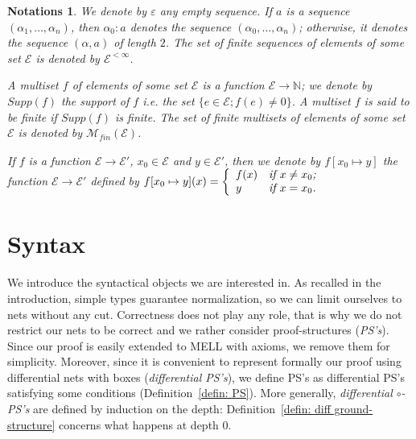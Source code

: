 \documentclass{article}
\theoremstyle{plain}
\newtheorem*{notations}{Notations}
\newcommand{\Nat}{\ensuremath{\mathbb{N}}}
\newcommand{\finitemultisets}[1]{\mathcal{M}_\textit{fin}(#1)}
\newcommand{\finitesequences}[1]{{#1}^{< \infty}}
\newcommand{\emptysequence}{\varepsilon}
\newcommand{\supp}[1]{\textit{Supp}(#1)}
\begin{document}
\begin{notations} 
We denote by $\emptysequence$ any empty sequence. If $a$ is a sequence $(\alpha_1, \ldots, \alpha_n)$, then $\alpha_0:a$ denotes the sequence $(\alpha_0, \ldots, \alpha_n)$; otherwise, it denotes the sequence $(\alpha, a)$ of length $2$. The set of finite sequences of elements of some set $\mathcal{E}$ is denoted by $\finitesequences{\mathcal{E}}$.

A multiset $f$ of elements of some set $\mathcal{E}$ is a function $\mathcal{E} \to \Nat$; we denote by $\supp{f}$ \emph{the support of $f$} i.e. the set $\{ e \in \mathcal{E} ; f(e) \not= 0 \}$. A multiset $f$ is said to be \emph{finite} if $\supp{f}$ is finite. The set of finite multisets of elements of some set $\mathcal{E}$ is denoted by $\finitemultisets{\mathcal{E}}$.

If $f$ is a function $\mathcal{E} \to \mathcal{E'}$, $x_0 \in \mathcal{E}$ and $y \in \mathcal{E'}$, then we denote by $f[x_0 \mapsto y]$ the function $\mathcal{E} \to \mathcal{E'}$ defined by $f[x_0 \mapsto y](x) = \left\lbrace \begin{array}{ll} f(x) & \textit{if $x \not= x_0$;}\\ y & \textit{if $ x = x_0$.} \end{array} \right.$
\end{notations}

\section{Syntax}\label{section: Syntax}

We introduce the syntactical objects we are interested in. As recalled in the introduction, simple types guarantee normalization, so we can limit ourselves to nets without any cut. Correctness does not play any role, that is why we do not restrict our nets to be correct and we rather consider proof-structures (\emph{PS's}). Since our proof is easily extended to MELL with axioms, we remove them for simplicity. Moreover, since it is convenient to represent formally our proof using differential nets with boxes (\emph{differential PS's}), we define PS's as differential PS's satisfying some conditions (Definition~\ref{defin: PS}). More generally, \emph{differential $\circ$-PS's} are defined by induction on the depth: Definition~\ref{defin: diff ground-structure} concerns what happens at depth $0$.

\begin{comment}
Moreover, since it is convenient to present our algorithm 

Differential PS's are differential nets possibly with boxes that contain proof-structures (Definition~\ref{defin: differential PS}). They are defined by induction on the depth; Definition~\ref{defin: diff ground-structure} concerns what happens at depth $0$. 
\end{comment}
\end{document}
